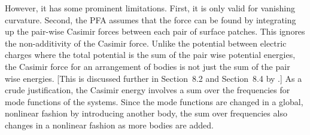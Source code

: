 However, it has some prominent limitations.  First, it is only valid for vanishing curvature.
Second, the PFA assumes that the force can be found by integrating up
the pair-wise Casimir forces between each pair of surface patches.  This ignores the non-additivity
of the Casimir force.  Unlike the potential between electric charges where the total potential is
the sum of the pair wise potential energies, the Casimir force for an arrangement
of bodies is not just the sum of the pair wise energies. [This is discussed further in Section~{8.2} and Section~{8.4} by \citet{Milonni1994}.]
As a crude justification, the Casimir energy involves a sum over the frequencies for mode functions 
of the systems.  Since the mode functions are changed in a global, nonlinear fashion by introducing another
body, the sum over frequencies also changes in a nonlinear fashion as more bodies are added.  


